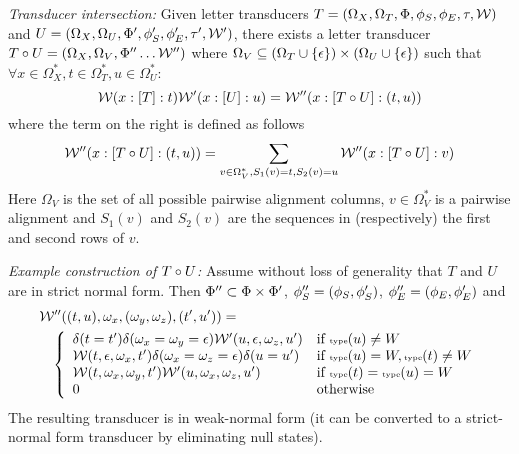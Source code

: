 \documentclass{beamer}
\begin{document}
\begin{frame}{}

{\em Transducer intersection:}
Given letter transducers
 $T = (\Omega_X, \Omega_T, \Phi, \phi_S, \phi_E, \tau, {\cal W})$ and
 $U = (\Omega_X, \Omega_U, \Phi', \phi_S', \phi_E', \tau', {\cal W}')$,
there exists a letter transducer $T\circ U = (\Omega_X, \Omega_V, \Phi'' \ldots {\cal W}'')$
where $\Omega_V \subseteq (\Omega_{T} \cup \{\epsilon\}) \times (\Omega_{U} \cup \{\epsilon\})$
such that $\forall x \in \Omega_X^\ast, t \in \Omega_T^\ast, u \in \Omega_U^\ast$:
\[
{\cal W}(x : [T] : t) {\cal W}'(x : [U] : u) = {\cal W}''(x : [T\circ U] : (t,u))
\]
where the term on the right is defined as follows
\[
{\cal W}''(x : [T\circ U] : (t,u)) = \sum_{v \in \Omega_V^\ast, S_1(v)=t, S_2(v)=u } {\cal W}''(x : [T\circ U] : v)
\]
Here $\Omega_V$ is the set of all possible pairwise alignment columns,
$v \in \Omega_V^\ast$ is a pairwise alignment and
$S_1(v)$ and $S_2(v)$ are the sequences in (respectively) the first and second rows of $v$.

\end{frame}

\begin{frame}{}

{\em Example construction of $T \circ U$:}
Assume without loss of generality that $T$ and $U$ are in strict normal form.
Then $\Phi'' \subset \Phi \times \Phi'$,
$\phi_S''=(\phi_S,\phi_S')$, $\phi_E''=(\phi_E,\phi_E')$
and
\small
\begin{eqnarray*}
\lefteqn{\weight''((t,u),\omega_x,(\omega_y,\omega_z),(t',u')) =} & & \\
 & & \left\{ \begin{array}{ll}
\delta(t=t') \delta(\omega_x=\omega_y=\epsilon) \weight'(u,\epsilon,\omega_z,u') & \mbox{if $\statetype(u) \neq W$} \\
\weight(t,\epsilon,\omega_x,t') \delta(\omega_x=\omega_z=\epsilon) \delta(u=u') & \mbox{if $\statetype(u) = W,\statetype(t) \neq W$} \\
\weight(t,\omega_x,\omega_y,t') \weight'(u,\omega_x,\omega_z,u') & \mbox{if $\statetype(t) = \statetype(u) = W$} \\
0 & \mbox{otherwise}
\end{array} \right.
\end{eqnarray*}
\normalsize
The resulting transducer is in weak-normal form (it can be converted to a strict-normal form transducer by eliminating null states).

\end{frame}
\end{document}
